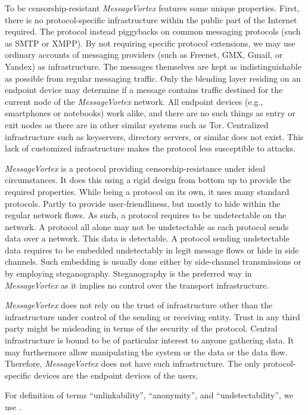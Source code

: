 \documentclass[acmsmall, screen, final, natbib=false]{acmart}
\begin{document}
	To be censorship-resistant \emph{MessageVortex} features some unique properties. First, there is no protocol-specific infrastructure within the public part of the Internet required. The protocol instead piggybacks on common messaging protocols (such as SMTP or XMPP). By not requiring specific protocol extensions, we may use ordinary accounts of messaging providers (such as Freenet, GMX, Gmail, or Yandex) as infrastructure. The messages themselves are kept as indistinguishable as possible from regular messaging traffic. Only the blending layer residing on an endpoint device may determine if a message contains traffic destined for the current node of the \emph{MessageVortex} network. All endpoint devices (e.g., smartphones or notebooks) work alike, and there are no such things as entry or exit nodes as there are in other similar systems such as Tor\cite{tor-spec}. Centralized infrastructure such as keyservers, directory servers, or similar does not exist. This lack of customized infrastructure makes the protocol less susceptible to attacks.
	
	\emph{MessageVortex} is a protocol providing censorship-resistance under ideal circumstances. It does this using a rigid design from bottom up to provide the required properties. While being a protocol on its own, it uses many standard protocols. Partly to provide user-friendliness, but mostly to hide within the regular network flows. As such, a protocol requires to be undetectable on the network. A protocol all alone may not be undetectable as each protocol sends data over a network. This data is detectable. A protocol sending undetectable data requires to be embedded undetectably in legit message flows or hide in side channels. Such embedding is usually done either by side-channel transmissions or by employing steganography. Steganography is the preferred way in \emph{MessageVortex} as it implies no control over the transport infrastructure.
	
	\emph{MessageVortex} does not rely on the trust of infrastructure other than the infrastructure under control of the sending or receiving entity. Trust in any third party might be misleading in terms of the security of the protocol. Central infrastructure is bound to be of particular interest to anyone gathering data. It may furthermore allow manipulating the system or the data or the data flow. Therefore, \emph{MessageVortex} does not have such infrastructure. The only protocol-specific devices are the endpoint devices of the users.
	
	For definition of terms ``unlinkability'', ``anonymity'', and ``undetectability'', we use \cite{anonTerminology}.
	
\end{document}
